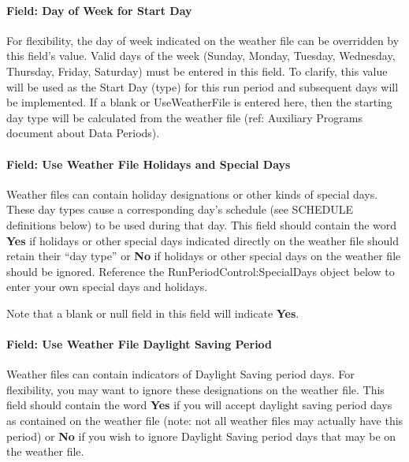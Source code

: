 \paragraph{Field: Day of Week for Start Day}\label{field-day-of-week-for-start-day-3}

For flexibility, the day of week indicated on the weather file can be overridden by this field's value. Valid days of the week (Sunday, Monday, Tuesday, Wednesday, Thursday, Friday, Saturday) must be entered in this field. To clarify, this value will be used as the Start Day (type) for this run period and subsequent days will be implemented. If a blank or UseWeatherFile is entered here, then the starting day type will be calculated from the weather file (ref: Auxiliary Programs document about Data Periods).

\paragraph{Field: Use Weather File Holidays and Special Days}\label{field-use-weather-file-holidays-and-special-days-1}

Weather files can contain holiday designations or other kinds of special days. These day types cause a corresponding day's schedule (see SCHEDULE definitions below) to be used during that day. This field should contain the word \textbf{Yes} if holidays or other special days indicated directly on the weather file should retain their ``day type'' or \textbf{No} if holidays or other special days on the weather file should be ignored. Reference the RunPeriodControl:SpecialDays object below to enter your own special days and holidays.

Note that a blank or null field in this field will indicate \textbf{Yes}.

\paragraph{Field: Use Weather File Daylight Saving Period}\label{field-use-weather-file-daylight-saving-period-3}

Weather files can contain indicators of Daylight Saving period days. For flexibility, you may want to ignore these designations on the weather file. This field should contain the word \textbf{Yes} if you will accept daylight saving period days as contained on the weather file (note: not all weather files may actually have this period) or \textbf{No} if you wish to ignore Daylight Saving period days that may be on the weather file.

